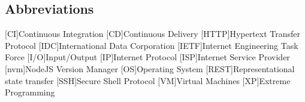 \newcommand{\abbr}{Abbreviations}
\subsection{Abbreviations}

\begin{acronym}[1234567890]		%
\setlength{\itemsep}{-\parsep}	%

[CI]{Continuous Integration}
[CD]{Continuous Delivery}
[HTTP]{Hypertext Transfer Protocol}
[IDC]{International Data Corporation}
[IETF]{Internet Engineering Task Force}
[I/O]{Input/Output}
[IP]{Internet Protocol}
[ISP]{Internet Service Provider}
[nvm]{NodeJS Version Manager}
[OS]{Operating System}
[REST]{Representational state transfer}
[SSH]{Secure Shell Protocol}
[VM]{Virtual Machines}
[XP]{Extreme Programming}
\end{acronym}